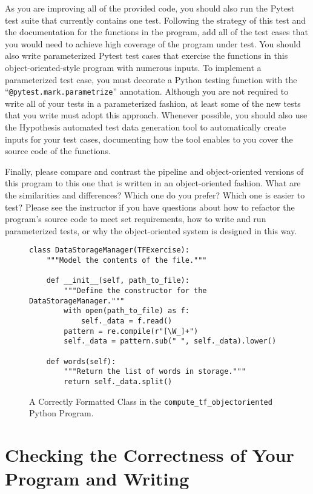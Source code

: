 \documentclass[11pt]{article}
\newcommand{\command}[1]{``\lstinline{#1}''}
\begin{document}
As you are improving all of the provided code, you should also run the Pytest
test suite that currently contains one test. Following the strategy of this test
and the documentation for the functions in the program, add all of the test
cases that you would need to achieve high coverage of the program under test.
%
You should also write parameterized Pytest test cases that exercise the
functions in this object-oriented-style program with numerous inputs. To
implement a parameterized test case, you must decorate a Python testing function
with the \command{@pytest.mark.parametrize} annotation.
%
Although you are not required to write all of your tests in a parameterized
fashion, at least some of the new tests that you write must adopt this approach.
%
Whenever possible, you should also use the Hypothesis automated test data
generation tool to automatically create inputs for your test cases, documenting
how the tool enables to you cover the source code of the functions.

Finally, please compare and contrast the pipeline and object-oriented versions
of this program to this one that is written in an object-oriented fashion. What
are the similarities and differences? Which one do you prefer? Which one is
easier to test?
%
Please see the instructor if you have questions about how to refactor the
program's source code to meet set requirements, how to write and run
parameterized tests, or why the object-oriented system is designed in this way.

\begin{figure}[t]
%
\begin{verbatim}
class DataStorageManager(TFExercise):
    """Model the contents of the file."""

    def __init__(self, path_to_file):
        """Define the constructor for the DataStorageManager."""
        with open(path_to_file) as f:
            self._data = f.read()
        pattern = re.compile(r"[\W_]+")
        self._data = pattern.sub(" ", self._data).lower()

    def words(self):
        """Return the list of words in storage."""
        return self._data.split()
\end{verbatim}
%
\vspace*{-.15in}
%
\caption{A Correctly Formatted Class in the {\tt compute\_tf\_objectoriented} Python Program.}\label{fig:data}
%
\vspace*{-.1in}
%
\end{figure}

\section*{Checking the Correctness of Your Program and Writing}
\end{document}
